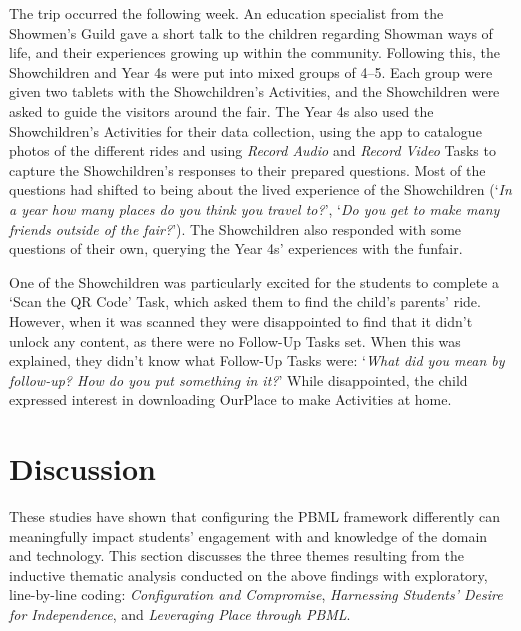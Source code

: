 The trip occurred the following week. An education specialist from the Showmen's Guild gave a short talk to the children regarding Showman ways of life, and their experiences growing up within the community. Following this, the Showchildren and Year 4s were put into mixed groups of 4--5. Each group were given two tablets with the Showchildren's Activities, and the Showchildren were asked to guide the visitors around the fair. The Year 4s also used the Showchildren's Activities for their data collection, using the app to catalogue photos of the different rides and using \textit{Record Audio} and \textit{Record Video} Tasks to capture the Showchildren's responses to their prepared questions. Most of the questions had shifted to being about the lived experience of the Showchildren (`\textit{In a year how many places do you think you travel to?}', `\textit{Do you get to make many friends outside of the fair?}'). The Showchildren also responded with some questions of their own, querying the Year 4s' experiences with the funfair.

One of the Showchildren was particularly excited for the students to complete a `Scan the QR Code' Task, which asked them to find the child's parents' ride. However, when it was scanned they were disappointed to find that it didn't unlock any content, as there were no Follow-Up Tasks set. When this was explained, they didn't know what Follow-Up Tasks were: `\textit{What did you mean by follow-up? How do you put something in it?}' While disappointed, the child expressed interest in downloading OurPlace to make Activities at home.

\section{Discussion}
These studies have shown that configuring the PBML framework differently can meaningfully impact students' engagement with and knowledge of the domain and technology. This section discusses the three themes resulting from the inductive thematic analysis conducted on the above findings with exploratory, line-by-line coding: \textit{Configuration and Compromise}, \textit{Harnessing Students' Desire for Independence}, and \textit{Leveraging Place through PBML}. 

